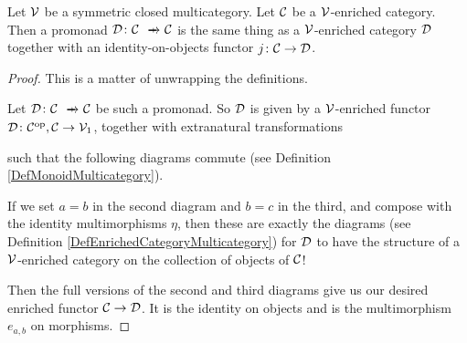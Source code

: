 \begin{proposition}
  \label{PropPromonadsAreCategories}
  Let ${\mathcal{V}}$ be a symmetric closed multicategory.  
  Let ${\mathcal{C}}$ be a ${\mathcal{V}}$-enriched category.  
  Then a promonad $\D\from \C\pto \C$ is the same thing as a ${\mathcal{V}}$-enriched category ${\mathcal{D}}$ together with an identity-on-objects functor $j\colon {\mathcal{C}} \to {\mathcal{D}}$.
\end{proposition}
\begin{proof}
  This is a matter of unwrapping the definitions.

  Let $\D\from \C \pto \C$ be such a promonad.  
  So ${\mathcal{D}}$ is given by a ${\mathcal{V}}$-enriched functor ${\mathcal{D}} \colon {\mathcal{C}}^{\mathrm{op}},{\mathcal{C}} \to {\mathcal{V}}_1$, together with extranatural transformations
  such that the following diagrams commute (see Definition \ref{DefMonoidMulticategory}).
  If we set $a=b$ in the second diagram and $b=c$ in the third, and compose with the identity multimorphisms $\eta$, then these are exactly the diagrams (see Definition \ref{DefEnrichedCategoryMulticategory}) for ${\mathcal{D}}$ to have the structure of a ${\mathcal{V}}$-enriched category on the collection of objects of ${\mathcal{C}}$!

  Then the full versions of the second and third diagrams give us our desired enriched functor ${\mathcal{C}}\to {\mathcal{D}}$.  
  It is the identity on objects and is the multimorphism $e_{a,b}$ on morphisms.


\end{proof}
